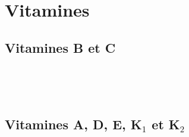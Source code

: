 \section{Vitamines}

\subsection{Vitamines B et C}

\begin{boiteCodeTex}{}
  \chemfig{!\thiamine}               %
  \chemfig{!\riboflavine} \\         %
  \chemfig{!\nicotinamide} \qq{}     %
  \chemfig{!\acideNicotinique} \qq{} %
  \chemfig{!\acidePantothenique}     %
\end{boiteCodeTex}{}

\begin{boiteCodeTex}{}
  \chemfig{!\pyroxidine}   %
  \chemfig{!\biotine} \\   %
  \chemfig[atom sep = 18pt]{!\acideFolique} %
\end{boiteCodeTex}

\begin{boiteCodeTex}{}
  \chemfig[atom sep = 18pt]{!\cyanocobalamine} %
\end{boiteCodeTex}

\begin{boiteCodeTex}{}
  \chemfig{!\acideAscorbique} %
\end{boiteCodeTex}

\subsection{Vitamines A, D, E, K$_1$ et K$_2$}

\begin{boiteCodeTex}{}
  \chemfig[atom sep = 18pt]{!\retinol} \\      %
  \chemfig[atom sep = 18pt]{!\cholecarciferol} %
\end{boiteCodeTex}
  
\begin{boiteCodeTex}{}
  \chemfig[atom sep = 18pt]{!\tocopherol} \\[8pt] %
  \chemfig[atom sep = 18pt]{!\tocotrienol}        %
\end{boiteCodeTex}
  
\begin{boiteCodeTex}{}
  \chemfig[atom sep = 18pt]{!\phylloquinone} \\[8pt] %
  \chemfig[atom sep = 18pt]{!\menatetrenone}         %
\end{boiteCodeTex}
